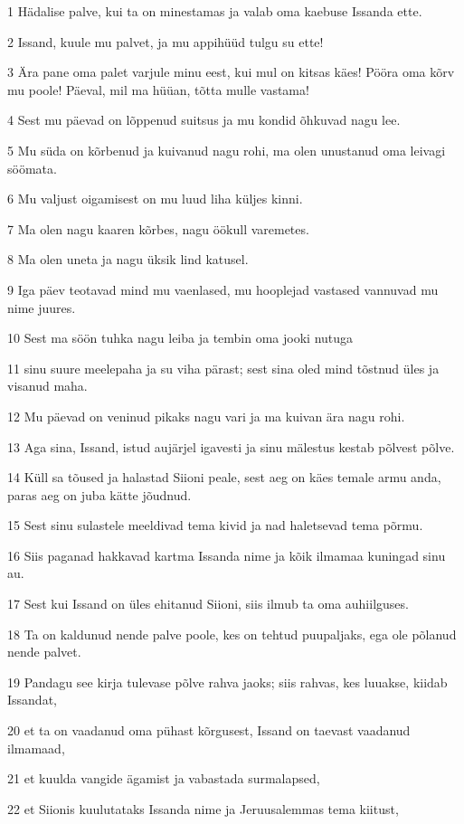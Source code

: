 \par 1 Hädalise palve, kui ta on minestamas ja valab oma kaebuse Issanda ette.
\par 2 Issand, kuule mu palvet, ja mu appihüüd tulgu su ette!
\par 3 Ära pane oma palet varjule minu eest, kui mul on kitsas käes! Pööra oma kõrv mu poole! Päeval, mil ma hüüan, tõtta mulle vastama!
\par 4 Sest mu päevad on lõppenud suitsus ja mu kondid õhkuvad nagu lee.
\par 5 Mu süda on kõrbenud ja kuivanud nagu rohi, ma olen unustanud oma leivagi söömata.
\par 6 Mu valjust oigamisest on mu luud liha küljes kinni.
\par 7 Ma olen nagu kaaren kõrbes, nagu öökull varemetes.
\par 8 Ma olen uneta ja nagu üksik lind katusel.
\par 9 Iga päev teotavad mind mu vaenlased, mu hooplejad vastased vannuvad mu nime juures.
\par 10 Sest ma söön tuhka nagu leiba ja tembin oma jooki nutuga
\par 11 sinu suure meelepaha ja su viha pärast; sest sina oled mind tõstnud üles ja visanud maha.
\par 12 Mu päevad on veninud pikaks nagu vari ja ma kuivan ära nagu rohi.
\par 13 Aga sina, Issand, istud aujärjel igavesti ja sinu mälestus kestab põlvest põlve.
\par 14 Küll sa tõused ja halastad Siioni peale, sest aeg on käes temale armu anda, paras aeg on juba kätte jõudnud.
\par 15 Sest sinu sulastele meeldivad tema kivid ja nad haletsevad tema põrmu.
\par 16 Siis paganad hakkavad kartma Issanda nime ja kõik ilmamaa kuningad sinu au.
\par 17 Sest kui Issand on üles ehitanud Siioni, siis ilmub ta oma auhiilguses.
\par 18 Ta on kaldunud nende palve poole, kes on tehtud puupaljaks, ega ole põlanud nende palvet.
\par 19 Pandagu see kirja tulevase põlve rahva jaoks; siis rahvas, kes luuakse, kiidab Issandat,
\par 20 et ta on vaadanud oma pühast kõrgusest, Issand on taevast vaadanud ilmamaad,
\par 21 et kuulda vangide ägamist ja vabastada surmalapsed,
\par 22 et Siionis kuulutataks Issanda nime ja Jeruusalemmas tema kiitust,
